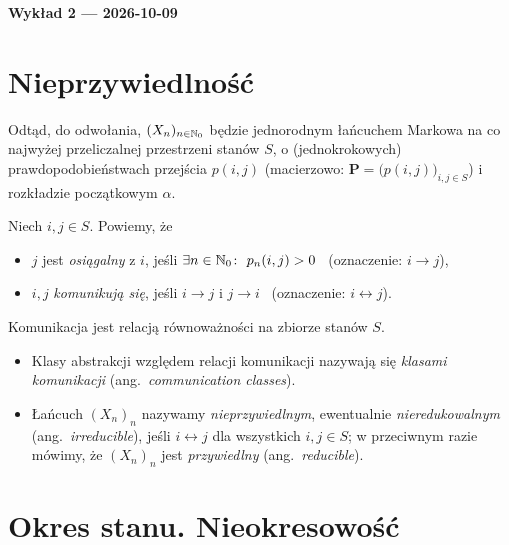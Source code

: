 \documentclass[dvipsnames]{book}
\begin{document}
\begin{center}
  {\Large\bfseries Wykład 2 --- 2026-10-09}
\end{center}

\section*{Nieprzywiedlność}

Odtąd, do odwołania, $(X_n)_{n \in \mathbb{N}_0}$ będzie jednorodnym łańcuchem Markowa
na co najwyżej przeliczalnej przestrzeni stanów $S$, o (jednokrokowych)
prawdopodobieństwach przejścia $p(i,j)$ (macierzowo:
$\mathbf{P} = \big(p(i,j)\big)_{i,j \in S}$) i rozkładzie początkowym $\alpha$.

\begin{definicja}
Niech $i,j \in S$. Powiemy, że
\begin{itemize}[topsep=0pt,itemsep=0pt]
  \item $j$ jest \emph{osiągalny} z $i$, jeśli
  $\exists n \in \mathbb{N}_0\colon\ p_n(i,j) > 0$ \ (oznaczenie: $i \to j$),
  \item $i,j$ \emph{komunikują się}, jeśli $i \to j$ i $j \to i$
  \ (oznaczenie: $i \leftrightarrow j$).
\end{itemize}
\end{definicja}

\begin{stwierdzenie}
Komunikacja jest relacją równoważności na zbiorze stanów $S$.
\end{stwierdzenie}

\begin{definicja}
\begin{itemize}[topsep=0pt,itemsep=0pt]
  \item Klasy abstrakcji względem relacji komunikacji nazywają się
  \emph{klasami komunikacji} (ang.\ \emph{communication classes}).
  \item Łańcuch $(X_n)_n$ nazywamy \emph{nieprzywiedlnym}, ewentualnie
  \emph{nieredukowalnym} (ang.\ \emph{irreducible}), jeśli $i \leftrightarrow j$
  dla wszystkich $i,j \in S$; w przeciwnym razie mówimy, że $(X_n)_n$ jest
  \emph{przywiedlny} (ang.\ \emph{reducible}).
\end{itemize}
\end{definicja}

\section*{Okres stanu. Nieokresowość}
\end{document}

